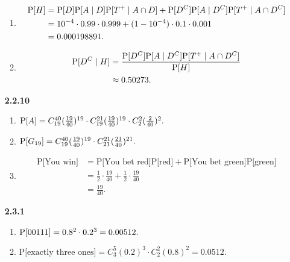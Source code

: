 \documentclass{article}
\begin{document}
\begin{enumerate}
\begin{enumerate}[label=(\alph*)]
        \item
        \begin{align*}
        \mbox P[H]
            & = \mbox P[D] \mbox P[A \mid D] \mbox P[T^+ \mid A \cap D] + \mbox P[D^C] \mbox P[A \mid D^C] \mbox P[T^+ \mid A \cap D^C] \\
            & = 10^{-4} \cdot 0.99 \cdot 0.999 + (1 - 10^{-4}) \cdot 0.1 \cdot 0.001 \\
            & = 0.000198891.
        \end{align*}

        \item
        \begin{align*}
        \mbox P[D^C \mid H]
            & = \frac{\mbox P[D^C] \mbox P[A \mid D^C] \mbox P[T^+ \mid A \cap D^C]}{\mbox P[H]} \\
            & \approx 0.50273.
        \end{align*}
    \end{enumerate}

    \item [\textbf{2.2.10}]
    
    \begin{enumerate}[label=(\alph*)]
        \item 
        $\mbox P[A] = C^{40}_{19}(\frac{19}{40})^{19} \cdot C^{21}_{19}(\frac{19}{40})^{19} \cdot C^2_2(\frac{2}{40})^2.$

        \item 
        $\mbox P[G_{19}] = C^{40}_{19}(\frac{19}{40})^{19} \cdot C^{21}_{21}(\frac{21}{40})^{21}.$

        \item 
        \begin{align*}
        \mbox{P[You win]} 
            & = \mbox{P[You bet red]} \mbox{P[red]} + \mbox{P[You bet green]} \mbox{P[green]} \\
            & = \frac{1}{2} \cdot \frac{19}{40} + \frac{1}{2} \cdot \frac{19}{40} \\
            & = \frac{19}{40}.
        \end{align*}
    \end{enumerate}

    \item [\textbf{2.3.1}]

    \begin{enumerate}[label=(\alph*)]
        \item $\mbox P[00111] = 0.8^2 \cdot 0.2^3 = 0.00512.$
        \item $\mbox{P[exactly three ones]} = C^5_3 (0.2)^3 \cdot C^2_2 (0.8)^2= 0.0512.$
    \end{enumerate}


\end{enumerate}
\end{document}
